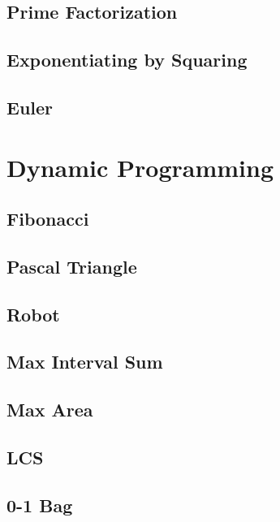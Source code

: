     \subsection{Prime Factorization}
        
    \subsection{Exponentiating by Squaring}
        
    \subsection{Euler}
        

\section{Dynamic Programming}
    \subsection{Fibonacci}
            
    \subsection{Pascal Triangle}
        
    \subsection{Robot}
        
    \subsection{Max Interval Sum}
        
    \subsection{Max Area}
        
    \subsection{LCS}
        
    \subsection{0-1 Bag}
        
